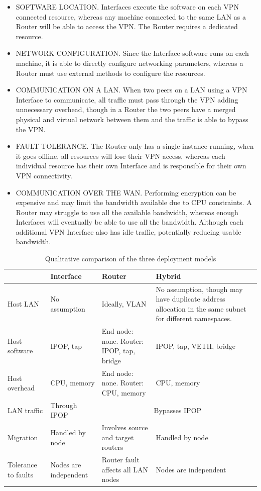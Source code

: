 \begin{itemize}

\item SOFTWARE LOCATION. Interfaces execute the software on each VPN connected
resource, whereas any machine connected to the same LAN as a Router will be
able to access the VPN.  The Router requires a dedicated resource.

\item NETWORK CONFIGURATION. Since the Interface software runs on each machine,
it is able to directly configure networking parameters, whereas a Router must
use external methods to configure the resources.

\item COMMUNICATION ON A LAN. When two peers on a LAN using a VPN Interface to
communicate, all traffic must pass through the VPN adding unnecessary overhead,
though in a Router the two peers have a merged physical and virtual network
between them and the traffic is able to bypass the VPN.

\item FAULT TOLERANCE. The Router only has a single instance running, when it
goes offline, all resources will lose their VPN access, whereas each individual
resource has their own Interface and is responsible for their own VPN
connectivity.

\item COMMUNICATION OVER THE WAN. Performing encryption can be expensive and
may limit the bandwidth available due to CPU constraints.  A Router may
struggle to use all the available bandwidth, whereas enough Interfaces will
eventually be able to use all the bandwidth.  Although each additional VPN
Interface also has idle traffic, potentially reducing usable bandwidth.

\end{itemize}

\begin{table}
\caption{Qualitative comparison of the three deployment models}
\label{tab:three_models}
\centering
\begin{tabular}{p{.95in}p{1.25in}p{1.5in}p{2.2in}} \hline
 & Interface & Router & Hybrid \\ \hline \hline
Host LAN 
& 
No assumption 
& 
Ideally, VLAN
&
No assumption, though may have duplicate address allocation in the same subnet
for different namespaces.\footnotemark[2]
\\ \hline
Host software
&
IPOP, tap
&
End node: none. Router: IPOP, tap, bridge 
&
IPOP, tap, VETH, bridge \\ \hline
Host overhead
&
CPU, memory
& 
End node: none. Router: CPU, memory
&
CPU, memory \\ \hline
LAN traffic
&
Through IPOP
&
\multicolumn{2}{c|}{Bypasses IPOP} \\ \hline
Migration
&
Handled by node
&
Involves source and target routers
&
Handled by node \\ \hline
Tolerance to faults
&
Nodes are independent
&
Router fault affects all LAN nodes
&
Nodes are independent \\ \hline
\end{tabular}
\end{table}

